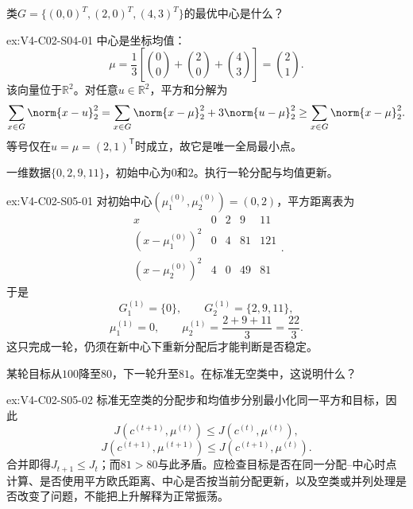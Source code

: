 \begin{SLChapterExercisePairSection}
\begin{exercise}\label{ex:V4-C02-S04-01}
类$G=\{(0,0)^T,(2,0)^T,(4,3)^T\}$的最优\kMeans{}中心是什么？
\end{exercise}
\ifSLFullEdition
{}\label{sol:V4-C02-S04-01}
\begin{chapterexercisesolution}{ex:V4-C02-S04-01}
中心是坐标均值：
\[
\mu=\frac13\left[\binom00+\binom20+\binom43\right]=\binom21.
\]
该向量位于$\mathbb R^2$。对任意$u\in\mathbb R^2$，平方和分解为
\[
\sum_{x\in G}\norm{x-u}_2^2
=\sum_{x\in G}\norm{x-\mu}_2^2+3\norm{u-\mu}_2^2
\ge\sum_{x\in G}\norm{x-\mu}_2^2.
\]
等号仅在$u=\mu=(2,1)^{\mathsf T}$时成立，故它是唯一全局最小点。
\end{chapterexercisesolution}
\fi

\begin{exercise}\label{ex:V4-C02-S05-01}
一维数据$\{0,2,9,11\}$，初始中心为$0$和$2$。执行一轮分配与均值更新。
\end{exercise}
\ifSLFullEdition
{}\label{sol:V4-C02-S05-01}
\begin{chapterexercisesolution}{ex:V4-C02-S05-01}
对初始中心$(\mu_1^{(0)},\mu_2^{(0)})=(0,2)$，平方距离表为
\[
\begin{array}{c|rrrr}
x&0&2&9&11\\\hline
(x-\mu_1^{(0)})^2&0&4&81&121\\
(x-\mu_2^{(0)})^2&4&0&49&81
\end{array}.
\]
于是
\[
G_1^{(1)}=\{0\},
\qquad
G_2^{(1)}=\{2,9,11\},
\]
\[
\mu_1^{(1)}=0,
\qquad
\mu_2^{(1)}=\frac{2+9+11}{3}=\frac{22}{3}.
\]
这只完成一轮，仍须在新中心下重新分配后才能判断是否稳定。
\end{chapterexercisesolution}
\fi

\begin{exercise}\label{ex:V4-C02-S05-02}
某轮目标从$100$降至$80$，下一轮升至$81$。在标准无空类\kMeans{}中，这说明什么？
\end{exercise}
\ifSLFullEdition
{}\label{sol:V4-C02-S05-02}
\begin{chapterexercisesolution}{ex:V4-C02-S05-02}
标准无空类\kMeans{}的分配步和均值步分别最小化同一平方和目标，因此
\[
J(c^{(t+1)},\mu^{(t)})
\le J(c^{(t)},\mu^{(t)}),
\]
\[
J(c^{(t+1)},\mu^{(t+1)})
\le J(c^{(t+1)},\mu^{(t)}).
\]
合并即得$J_{t+1}\le J_t$；而$81>80$与此矛盾。应检查目标是否在同一分配--中心时点计算、是否使用平方欧氏距离、中心是否按当前分配更新，以及空类或并列处理是否改变了问题，不能把上升解释为正常振荡。
\end{chapterexercisesolution}
\fi

\end{SLChapterExercisePairSection}
